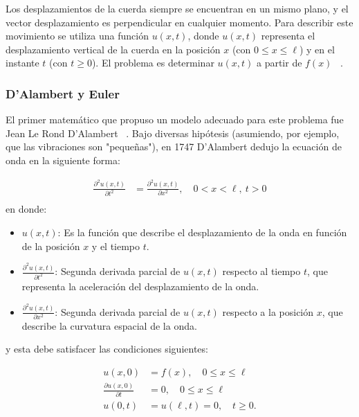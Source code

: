 Los desplazamientos de la cuerda siempre se encuentran en un mismo plano, y el vector desplazamiento es perpendicular en cualquier momento. Para describir este movimiento se utiliza una función $u(x, t)$, donde $u(x, t)$ representa el desplazamiento vertical de la cuerda en la posición $x$ (con $0 \leq x \leq \ell$) y en el instante $t$ (con $t \geq 0$). El problema es determinar $u(x, t)$ a partir de $f(x)$ ~\cite{weinbergerEDP}.

\subsubsection{D’Alambert y Euler}
El primer matemático que propuso un modelo adecuado para este problema fue Jean Le Rond D’Alambert ~\cite{unal_52162}. Bajo diversas hipótesis (asumiendo, por ejemplo, que las vibraciones son "pequeñas"), en 1747 D’Alambert dedujo la ecuación de onda en la siguiente forma:

\begin{equation} \label{eq1}
	\begin{split}
		\frac{\partial^2 u(x,t)}{\partial t^2} &=  \frac{\partial^2 u(x,t)}{\partial x^2}, \quad 0 < x < \ell, \ t > 0 \\
	\end{split}
\end{equation}
en donde:
\begin{itemize}
	\item \( u(x,t) \): Es la función que describe el desplazamiento de la onda en función de la posición \( x \) y el tiempo \( t \).
	\item \( \frac{\partial^2 u(x,t)}{\partial t^2} \): Segunda derivada parcial de \( u(x,t) \) respecto al tiempo \( t \), que representa la aceleración del desplazamiento de la onda.
	\item \( \frac{\partial^2 u(x,t)}{\partial x^2} \): Segunda derivada parcial de \( u(x,t) \) respecto a la posición \( x \), que describe la curvatura espacial de la onda.
\end{itemize}

 y esta debe satisfacer las condiciones siguientes:

\begin{equation} \label{eq2}
	\begin{split}
		u(x,0) &= f(x), \quad 0 \leq x \leq \ell \\
		\frac{\partial u(x,0)}{\partial t} &= 0, \quad 0 \leq x \leq \ell \\
		u(0,t) &= u(\ell,t) = 0, \quad t \geq 0.
	\end{split}
\end{equation}


